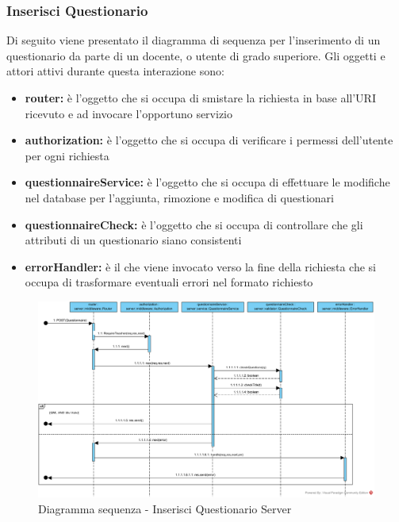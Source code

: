 \documentclass[12pt,a4paper]{article}
\begin{document}
\newpage
\subsubsection{Inserisci Questionario}
Di seguito viene presentato il diagramma di sequenza per l'inserimento di un questionario da parte di un docente, o utente di grado superiore. Gli oggetti e attori attivi durante questa interazione sono:

\begin{itemize}
	\item \textbf{router:} è l'oggetto che si occupa di smistare la richiesta in base all’URI ricevuto e ad invocare l’opportuno servizio
	\item \textbf{authorization:} è l'oggetto che si occupa di verificare i permessi dell'utente per ogni richiesta	
	\item \textbf{questionnaireService:} è l'oggetto che si occupa di effettuare le modifiche nel database per l'aggiunta, rimozione e modifica di questionari
	\item \textbf{questionnaireCheck:} è l'oggetto che si occupa di controllare che gli attributi di un questionario siano consistenti
	\item \textbf{errorHandler:} è il  che viene invocato verso la fine della richiesta che si occupa di trasformare eventuali errori nel formato  richiesto
\end{itemize}

\begin{center}
	\begin{figure}[H]
		\centering \includegraphics[max width=\myheight, angle=90]{../img/diagrammiSequenza/inserisciQuestionarioServer.png}
		\caption{Diagramma sequenza - Inserisci Questionario Server}
	\end{figure}
\end{center}
\end{document}
